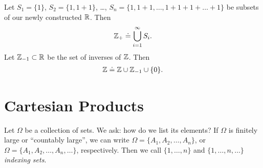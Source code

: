 \begin{definition}
	Let $S_{1} = \{1\}$, 
	$S_{2} = \{1, 1+1\}$, \dots, $S_{n} = \{1, 1+1, \dots, 1+1+1+\dots+1\}$
	be subsets of our newly constructed $\mathbb{R}$. Then
	\begin{equation*}
		\begin{split}
			\mathbb{Z}_{+} \doteq \bigcup_{i=1}^{\infty} S_{i}.
		\end{split}
	\end{equation*}
	Let $\mathbb{Z}_{-1} \subset \mathbb{R}$ be the set of inverses of $\mathbb{Z}$. Then
	\begin{equation*}
		\begin{split}
			\mathbb{Z} \doteq \mathbb{Z} \cup \mathbb{Z}_{-1} \cup \{0\}.
		\end{split}
	\end{equation*}
\end{definition}
\begin{definition}[Induction]
\end{definition}
\section{Cartesian Products} 
Let $\Omega$ be a collection of sets. We ask: how do we list its elements?
If $\Omega$ is finitely large or ``countably large'', we can write
$\Omega = \{ A_{1}, A_{2}, \dots, A_{n}\}$, or
$\Omega = \{ A_{1}, A_{2}, \dots, A_{n}, \dots\}$, respectively.
Then we call $\{ 1,\dots, n\}$ and $\{1, \dots, n, \dots\}$ \emph{indexing
sets}.

